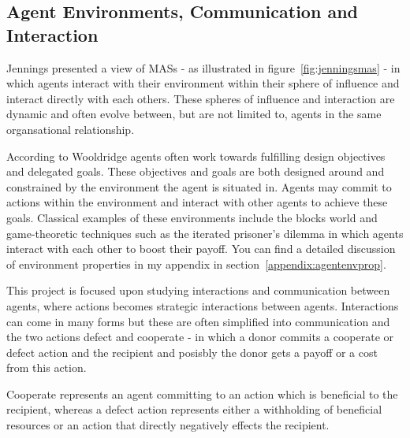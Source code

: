 \documentclass[]{final_report}
\begin{document}
\subsection{Agent Environments, Communication and Interaction}
Jennings presented a view of MASs - as illustrated in figure~\ref{fig:jenningsmas} - in which agents interact with their environment within their sphere of influence and interact directly with each others. These spheres of influence and interaction are dynamic and often evolve between, but are not limited to, agents in the same organsational relationship.\par 
According to Wooldridge agents often work towards fulfilling design objectives and delegated goals. These objectives and goals are both designed around and constrained by the environment the agent is situated in. Agents may commit to actions within the environment and interact with other agents to achieve these goals. Classical examples of these environments include the blocks world and game-theoretic techniques such as the iterated prisoner's dilemma in which agents interact with each other to boost their payoff. You can find a detailed discussion of environment properties in my appendix in section~\ref{appendix:agentenvprop}.\par
This project is focused upon studying interactions and communication between agents, where actions becomes strategic interactions between agents. Interactions can come in many forms but these are often simplified into communication and the two actions defect and cooperate - in which a donor commits a cooperate or defect action and the recipient and posisbly the donor gets a payoff or a cost from this action.\par  
Cooperate represents an agent committing to an action which is beneficial to the recipient, whereas a defect action represents either a withholding of beneficial resources or an action that directly negatively effects the recipient.\par 
\end{document}
